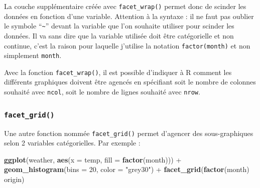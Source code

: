 \documentclass[a4paperpaper,]{article}
\newenvironment{Shaded}{\begin{snugshade}}{\end{snugshade}}
\newcommand{\DataTypeTok}[1]{\textcolor[rgb]{0.00,0.34,0.68}{#1}}
\newcommand{\DecValTok}[1]{\textcolor[rgb]{0.69,0.50,0.00}{#1}}
\newcommand{\KeywordTok}[1]{\textcolor[rgb]{0.12,0.11,0.11}{\textbf{#1}}}
\newcommand{\NormalTok}[1]{\textcolor[rgb]{0.12,0.11,0.11}{#1}}
\newcommand{\OperatorTok}[1]{\textcolor[rgb]{0.12,0.11,0.11}{#1}}
\newcommand{\StringTok}[1]{\textcolor[rgb]{0.75,0.01,0.01}{#1}}
\begin{document}
La couche supplémentaire créée avec \texttt{facet\_wrap()} permet donc de scinder les données en fonction d'une variable. Attention à la syntaxe : il ne faut pas oublier le symbole ``\texttt{\textasciitilde{}}'' devant la variable que l'on souhaite utiliser pour scinder les données. Il va sans dire que la variable utilisée doit être catégorielle et non continue, c'est la raison pour laquelle j'utilise la notation \texttt{factor(month)} et non simplement \texttt{month}.

Avec la fonction \texttt{facet\_wrap()}, il est possible d'indiquer à R comment les différents graphiques doivent être agencés en spécifiant soit le nombre de colonnes souhaité avec \texttt{ncol}, soit le nombre de lignes souhaité avec \texttt{nrow}.

\hypertarget{facet_grid}{%
\subsubsection{\texorpdfstring{\texttt{facet\_grid()}}{facet\_grid()}}\label{facet_grid}}

Une autre fonction nommée \texttt{facet\_grid()} permet d'agencer des sous-graphiques selon 2 variables catégorielles. Par exemple :

\begin{Shaded}
\begin{Highlighting}[]
\KeywordTok{ggplot}\NormalTok{(weather, }\KeywordTok{aes}\NormalTok{(}\DataTypeTok{x =}\NormalTok{ temp, }\DataTypeTok{fill =} \KeywordTok{factor}\NormalTok{(month))) }\OperatorTok{+}
\StringTok{  }\KeywordTok{geom_histogram}\NormalTok{(}\DataTypeTok{bins =} \DecValTok{20}\NormalTok{, }\DataTypeTok{color =} \StringTok{"grey30"}\NormalTok{) }\OperatorTok{+}
\StringTok{  }\KeywordTok{facet_grid}\NormalTok{(}\KeywordTok{factor}\NormalTok{(month) }\OperatorTok{~}\StringTok{ }\NormalTok{origin)}
\end{Highlighting}
\end{Shaded}
\end{document}
